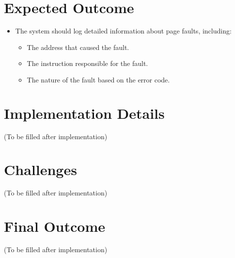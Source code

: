 \documentclass[a4paper,12pt]{report}
\begin{document}
\section{Expected Outcome}
\begin{itemize}
    \item The system should log detailed information about page faults, including:
    \begin{itemize}
        \item The address that caused the fault.
        \item The instruction responsible for the fault.
        \item The nature of the fault based on the error code.
    \end{itemize}
\end{itemize}

\section{Implementation Details}
(To be filled after implementation)

\section{Challenges}
(To be filled after implementation)

\section{Final Outcome}
(To be filled after implementation)
\end{document}
